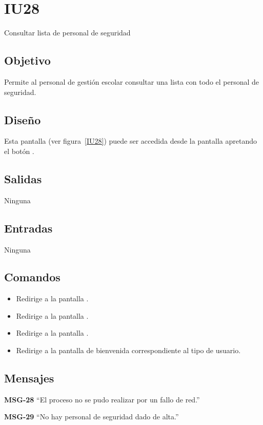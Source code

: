 
\section{IU28} {Consultar lista de personal de seguridad}
\subsection{Objetivo}
   Permite al personal de gestión escolar consultar una lista con todo el personal de seguridad.
\subsection{Diseño}
    Esta pantalla  (ver figura~\ref{IU28}) puede ser accedida desde la pantalla  apretando el botón .

\subsection{Salidas}
Ninguna
\subsection{Entradas}
Ninguna
\subsection{Comandos}
\begin{itemize}
    \item {} Redirige a la pantalla .
    \item {} Redirige a la pantalla .
    \item {} Redirige a la pantalla .
    \item {} Redirige a la pantalla de bienvenida correspondiente al tipo de usuario.
    
\end{itemize}

\subsection{Mensajes}

\begin{Citemize}
    \item {\bf MSG-28}  ``El proceso no se pudo realizar por un fallo de red.''
    \item {\bf MSG-29}  ``No hay personal de seguridad dado de alta.''
    
\end{Citemize}


